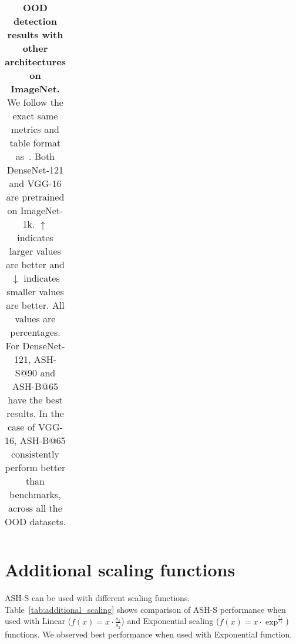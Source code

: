 \documentclass{article}
\newcommand{\tablabel}[1]{\label{tab:#1}}
\newcommand{\tabref}[1]{Table~\ref{tab:#1}}
\begin{document}
\begin{table}[hbt!]
{\begin{tabular}{c c c c c c c c c c c c}
\end{tabular}}
\caption{\textbf{OOD detection results with other architectures on ImageNet.} We follow the exact same metrics and table format as~\citet{react}. Both DenseNet-121 and VGG-16 are pretrained on ImageNet-1k. $\uparrow$ indicates larger values are better and $\downarrow$ indicates smaller values are better. All values are percentages. For DenseNet-121, ASH-S@90 and ASH-B@65 have the best results. In the case of VGG-16, ASH-B@65 consistently perform better than benchmarks, across all the OOD datasets.}
\tablabel{other_architectures}

\end{table}


\section{Additional scaling functions}
ASH-S can be used with different scaling functions. \tabref{additional_scaling} shows comparison of ASH-S performance when used with Linear ($f(x) = x \cdot \frac{s_1}{s_2}$) and Exponential scaling ($f(x) = x \cdot \exp^{\frac{s_1}{s_2}}$) functions. We observed best performance when used with Exponential function.


\begin{table}[hbt!]
\caption{\textbf{Comparison of different scaling functions used with ASH-S.} }
\tablabel{additional_scaling}

\end{table}
\end{document}
